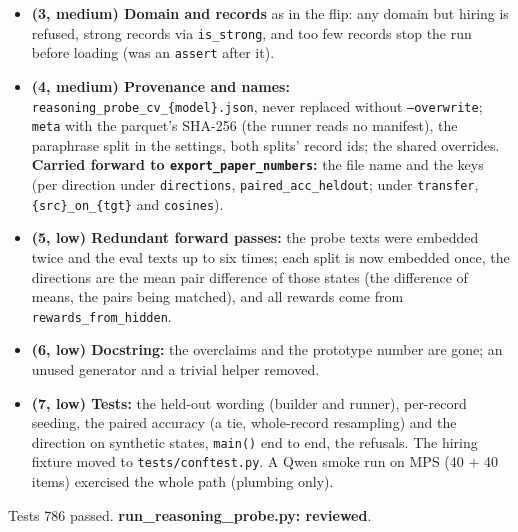\documentclass{article}
\begin{document}
\begin{itemize}
        record-bootstrap interval (a record's two pairs resampled together); each metric, baseline and nulled, and
        nulled $-$ baseline have intervals (\texttt{reasoning\_intervals}); the cosines are point values (length-type).
        The in-sample accuracy is replaced by the same paired accuracy on the probe split, for comparison.
  \item \textbf{(3, medium) Domain and records} as in the flip: any domain but hiring is refused, strong records via
        \texttt{is\_strong}, and too few records stop the run before loading (was an \texttt{assert} after it).
  \item \textbf{(4, medium) Provenance and names:} \texttt{reasoning\_probe\_cv\_\{model\}.json}, never replaced
        without \texttt{--overwrite}; \texttt{meta} with the parquet's SHA-256 (the runner reads no manifest), the
        paraphrase split in the settings, both splits' record ids; the shared overrides. \textbf{Carried forward to
        \texttt{export\_paper\_numbers}:} the file name and the keys (per direction under \texttt{directions},
        \texttt{paired\_acc\_heldout}; under \texttt{transfer}, \texttt{\{src\}\_on\_\{tgt\}} and
        \texttt{cosines}).
  \item \textbf{(5, low) Redundant forward passes:} the probe texts were embedded twice and the eval texts up to six
        times; each split is now embedded once, the directions are the mean pair difference of those states (the
        difference of means, the pairs being matched), and all rewards come from \texttt{rewards\_from\_hidden}.
  \item \textbf{(6, low) Docstring:} the overclaims and the prototype number are gone; an unused generator and a
        trivial helper removed.
  \item \textbf{(7, low) Tests:} the held-out wording (builder and runner), per-record seeding, the paired accuracy
        (a tie, whole-record resampling) and the direction on synthetic states, \texttt{main()} end to end, the
        refusals. The hiring fixture moved to \texttt{tests/conftest.py}. A Qwen smoke run on MPS (40 $+$ 40 items)
        exercised the whole path (plumbing only).
\end{itemize}
Tests 786 passed. \textbf{run\_reasoning\_probe.py: reviewed}.
\end{document}
